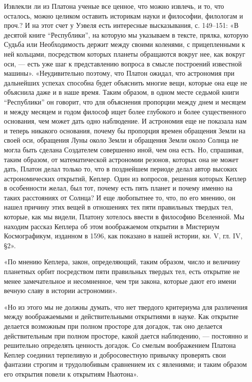 Извлекли ли  из Платона ученые  все ценное,  что можно извлечь,  и то,
что  осталось, можно  целиком  оставить историкам  науки и  философии,
филологам  и  проч.?   И  на  этот  счет  у   Уэвеля  есть  интересные
высказывания, с. 149--151: «В десятой книге ``Республики'', на которую
мы указываем в тексте, прялка, которую Судьба или Необходимость держит
между  своими коленями,  с прицепленными  к ней  кольцами, посредством
которых  планеты  обращаются вокруг  нее,  как  вокруг оси,  ---  есть
уже  шаг  к  представлению   вопроса  в  смысле  построений  известной
машины». «Неудивительно поэтому, что Платон ожидал, что астрономия при
дальнейших успехах  способна будет объяснить многие  вещи, которые она
еще не  объяснила даже и  в наше время.  Таким образом, в  одном месте
седьмой книги ``Республики'' он  говорит, что для объяснения пропорции
между  днем и  месяцем  и между  месяцем и  годом  философ ищет  более
глубокого  и  более  существенного  основания,  чем  может  дать  одно
наблюдение.  И  астрономия  еще  не показала  нам  и  теперь  никакого
основания, почему  бы пропорция времен  обращения Земли на  своей оси,
обращения Луны  около Земли  и обращения Земли  около Солнца  не могла
быть сделана Создателем совершенно иной,  чем она есть. Но, спрашивая,
таким образом,  от математической  астрономии резонов, которых  она не
может дать,  Платон делал  только то, что  в позднейшем  периоде делал
автор  высоких астрономических  открытий,  Кеплер.  Один из  вопросов,
решения которых Кеплер в особенности  желал, был тот, почему есть пять
планет  и  почему  именно  на  таких  расстояниях  от  Солнца?  И  еще
любопытнее  то, что,  по его  мнению, он  нашел причину  этих вещей  в
отношениях тех  пяти правильных твердых  тел, которые, как  мы видели,
Платону  хотелось ввести  в  философию Вселенной.  Мы находим  рассказ
Кеплера  об  этом  воображаемом открытии  в  Мистериум  Космографикум,
изданном в 1596, как показано в нашей истории, кн. V, гл. IV, §2».

«По  мнению  Кеплера,  закон,  определяющий, таким  образом,  число  и
величину планетных орбит посредством пяти правильных твердых тел, есть
открытие не менее замечательное и несомненное, чем три закона, которые
дают его имени вечную славу в истории астрономии».

«Но  из  этого  мы  не  должны думать,  что  нет  твердого  критериума
для  различения между  воображаемыми  и  действительными открытиями  в
науке.  Как  открытие  делается  возможным  при  полном  просторе  для
догадок, так  оно делается  действительным при полном  просторе, какой
дается  наблюдению, ---  постоянно  и  решительно определять  ценность
догадок. Со  смелым воображением Платона Кеплер  соединил терпеливую и
добросовестную привычку проверять свои фантазии строгим и трудолюбивым
сравнением  их с  явлениями; и  таким  образом его  открытия повели  к
открытиям Ньютона».

